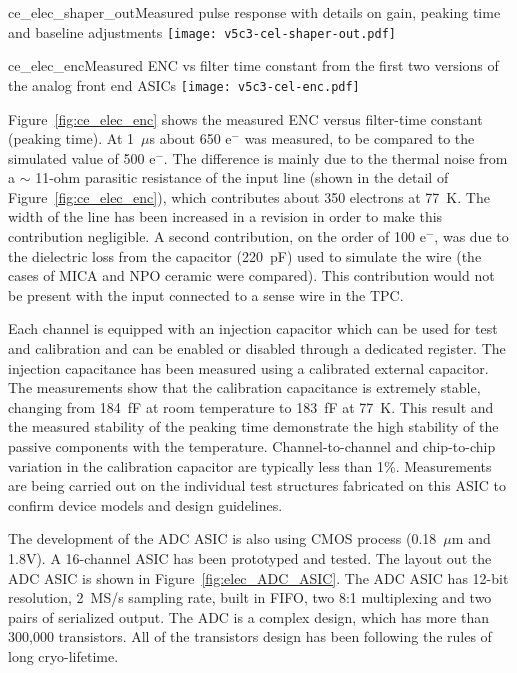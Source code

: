 \begin{cdrfigure}{ce_elec_shaper_out}{Measured pulse response with details on gain, peaking time and baseline adjustments}
\texttt{[image: v5c3-cel-shaper-out.pdf]}
\end{cdrfigure}

\begin{cdrfigure}{ce_elec_enc}{Measured ENC vs filter time constant from the first two versions of the analog front end ASICs}
\texttt{[image: v5c3-cel-enc.pdf]}
\end{cdrfigure}

Figure~\ref{fig:ce_elec_enc} shows the measured ENC versus filter-time constant (peaking time).
At 1~$\mu$s about 650 e$^{-}$ was measured, to be compared to the simulated value of 500 e$^{-}$.
The difference is mainly due to the thermal noise from a $\sim$ 11-ohm parasitic resistance of the input
line (shown in the detail of Figure~\ref{fig:ce_elec_enc}), which contributes about 350 electrons at 77~K.
The width of the line has been increased in a revision in order to make this contribution negligible.
A second contribution, on the order of 100 e$^{-}$,
was due to the dielectric loss from the capacitor (220~pF) used to simulate the wire
(the cases of MICA and NPO ceramic were compared).
This contribution would not be present with the input connected to a sense wire in the TPC.

Each channel is equipped with an injection capacitor which can be used
for test and calibration and can be enabled or disabled through a
dedicated register. The injection capacitance has been measured using 
a calibrated external capacitor. The measurements show
that the calibration capacitance is extremely stable, changing from
184~fF at room temperature to 183~fF at 77~K. This result and the measured
stability of the peaking time demonstrate the high stability of the
passive components with the temperature. Channel-to-channel and chip-to-chip
variation in the calibration capacitor are typically less than 1\%. Measurements are being carried
out on the individual test structures fabricated on this ASIC to
confirm device models and design guidelines.

The development of the ADC ASIC is also using CMOS process (0.18~$\mu$m and 1.8V).
A 16-channel ASIC has been prototyped and tested.
The layout out the ADC ASIC is shown in Figure~\ref{fig:elec_ADC_ASIC}. 
The ADC ASIC has 12-bit resolution, 2~MS/s sampling rate, built in FIFO, two 8:1 multiplexing and two pairs of serialized output.
The ADC is a complex design, which has more than 300,000 transistors.
All of the transistors design has been following the rules of long cryo-lifetime.

